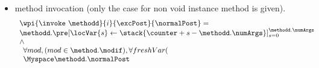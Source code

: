 \begin{itemize}
\begin{enumerate}
	\end{enumerate}
	 				 	\item method invocation  (only the case for non void instance method is given). 
	 				 			$$\begin{array}{l}
								 \wpi{\invoke  \   \methodd} {i} {\excPost}{\normalPost}  =   \\
	 				 		 \methodd.\pre[ \locVar{s} \leftarrow \stack{\counter + s -\methodd.\numArgs}]_{s = 0}^{\methodd.\numArgs }  \\
	 				 			\wedge \\
								\begin{array}{l}
	 				 			       \forall  mod ,  ( mod \in \method.\modif ), \forall freshVar (  \\ 
	 				 				              \Myspace \methodd.\normalPost \begin{array}{l}

\end{array}
\end{array}
\end{array}$$
\end{itemize}
